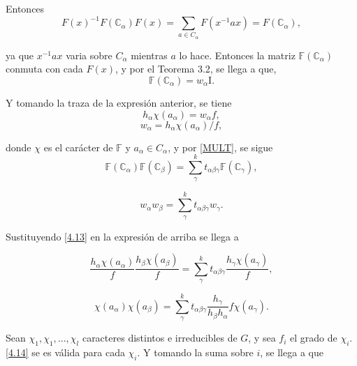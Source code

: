 \documentclass[12pt]{book}
\theoremstyle{definition}
\newcounter{in}
\begin{document}
Entonces 
\begin{equation*}
  F(x)^{-1}F(\mathbb{C}_{\alpha})F(x)=\sum_{a \in C_{\alpha}}F(x^{-1}ax)=F(\mathbb{C}_{\alpha}),
\end{equation*}

ya que $x^{-1}ax$ varia sobre $C_{\alpha}$ mientras $a$ lo
hace. Entonces la matriz $\mathbb{F} (\mathbb{C}_{\alpha})$ conmuta
con cada $F(x)$, y por el Teorema 3.2, se llega a que,
\begin{equation*}
   \mathbb{F} (\mathbb{C}_{\alpha})=w_{\alpha}\mathrm{I}.
\end{equation*}

Y tomando la traza de la expresión anterior, se tiene
\begin{equation*}
  h_{\alpha}\chi(a_{\alpha})=w_{\alpha}f,
\end{equation*}
\begin{equation*} \label{4.13}
  w_{\alpha}=h_{\alpha}\chi(a_{\alpha})/f,
\end{equation*}

donde $\chi$ es el carácter de $\mathbb{F}$ y
$a_{\alpha} \in C_{\alpha}$, y por \ref{MULT}, se sigue
\begin{equation*}
  \mathbb{F} (\mathbb{C}_{\alpha})  \mathbb{F} (\mathbb{C}_{\beta}) = \sum_{\gamma}^{k} t_{\alpha \beta \gamma} \mathbb{F}(\mathbb{C}_{\gamma}),
\end{equation*}

\begin{equation*}
  w_{\alpha}w_{\beta} = \sum_{\gamma}^{k} t_{\alpha \beta \gamma} w_{\gamma}.
\end{equation*}

Sustituyendo \ref{4.13} en la expresión de arriba se llega a

\begin{equation*}
  \frac{h_{\alpha} \chi(a_{\alpha})}{f} \frac{h_{\beta} \chi(a_{\beta})}{f} = \sum_{\gamma}^{k} t_{\alpha \beta \gamma} \frac{h_{\gamma} \chi(a_{\gamma})}{f},
\end{equation*}

\begin{equation*} \label{4.14}
   \chi(a_{\alpha}) \chi(a_{\beta}) = \sum_{\gamma}^{k} t_{\alpha \beta \gamma} \frac{h_{\gamma}}{h_{\beta} h_{\alpha}} f \chi(a_{\gamma}).
\end{equation*}

Sean $\chi_{1}, \chi_{1},..., \chi_{l}$ caracteres distintos e
irreducibles de $G$, y sea $f_{i}$ el grado de $\chi_{i}$. \ref{4.14}
se es válida para cada $\chi_{i}$. Y tomando la suma sobre $i$, se
llega a que
\end{document}

